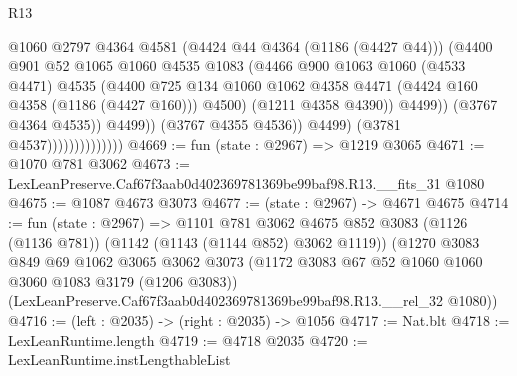 \begin{lexlean}{R13}
\begin{coremodule}
                                          @1060
                                          @2797
                                          @4364
                                          @4581
                                          (@4424 @44 @4364 (@1186 (@4427 @44)))
                                          (@4400
                                            @901
                                            @52
                                            @1065
                                            @1060
                                            @4535
                                            @1083
                                            (@4466
                                              @900
                                              @1063
                                              @1060
                                              (@4533 @4471)
                                              @4535
                                              (@4400
                                                @725
                                                @134
                                                @1060
                                                @1062
                                                @4358
                                                @4471
                                                (@4424 @160 @4358 (@1186 (@4427 @160)))
                                                @4500)
                                              (@1211 @4358 @4390))
                                            @4499))
                                        (@3767 @4364 @4535))
                                      @4499))
                                  (@3767 @4355 @4536))
                                @4499)
                              (@3781 @4537))))))))))))))
@4669 := fun (state : @2967) => @1219 @3065
@4671 := @1070 @781 @3062
@4673 := LexLeanPreserve.Caf67f3aab0d402369781369be99baf98.R13.__fits_31 @1080
@4675 := @1087 @4673 @3073
@4677 := (state : @2967) -> @4671 @4675
@4714 := fun (state : @2967) =>
  @1101
    @781
    @3062
    @4675
    @852
    @3083
    (@1126 (@1136 @781))
    (@1142 (@1143 (@1144 @852) @3062 @1119))
    (@1270
      @3083
      @849
      @69
      @1062
      @3065
      @3062
      @3073
      (@1172 @3083 @67 @52 @1060 @1060 @3060 @1083 @3179 (@1206 @3083))
      (LexLeanPreserve.Caf67f3aab0d402369781369be99baf98.R13.__rel_32 @1080))
@4716 := (left : @2035) -> (right : @2035) -> @1056
@4717 := Nat.blt
@4718 := LexLeanRuntime.length
@4719 := @4718 @2035
@4720 := LexLeanRuntime.instLengthableList

\end{coremodule}
\end{lexlean}
